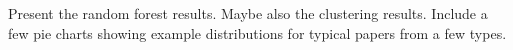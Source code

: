 \documentclass{svmult}
\begin{document}
Present the random forest results. Maybe also the clustering results. Include a few pie charts showing example distributions for typical papers from a few types. 







%
%


\end{document}
